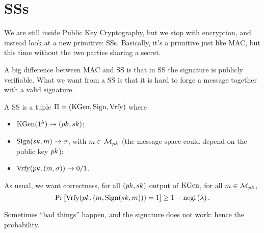 \section{\aclp{SS}}

We are still inside Public Key Cryptography, but we stop with encryption, and instead look at a new primitive: \acp{SS}.
Basically, it's a primitive just like \ac{MAC}, but this time without the two parties sharing a secret.


A big difference between \ac{MAC} and \ac{SS} is that in \ac{SS} the signature is publicly verifiable.
What we want from a \ac{SS} is that it is hard to forge a message together with a valid signature.

\begin{definition}[\acl{SS}]
	A \ac{SS} is a tuple $\Pi = \left( \mathrm{KGen} , \allowbreak \mathrm{Sign} , \allowbreak \mathrm{Vrfy} \right)$ where
	\begin{itemize}
		\item $\mathrm{KGen}(1^{\lambda}) \to (pk, sk)$;
		\item $\mathrm{Sign}(sk, m) \to \sigma$, with $m \in \mathcal{M}_{pk}$ (the message space could depend on the public key $pk$);
		\item $\mathrm{Vrfy}(pk, (m, \sigma)) \to 0/1$.
	\end{itemize}
	As usual, we want correctness, \ie for all $(pk, sk)$ output of $\mathrm{KGen}$, for all $m \in \mathcal{M}_{pk}$,
	\begin{equation*}
		\mathop{\mathrm{Pr}}\limits_{} \left[ {
			\mathrm{Vrfy}(pk, (m, \mathrm{Sign}(sk, m))) = 1
		} \right] \ge 1 - \mathrm{negl}\left({\lambda}\right).
	\end{equation*}
	Sometimes ``bad things'' happen, and the signature does not work: hence the probability.
\end{definition}

\begin{definition}

\end{definition}








































